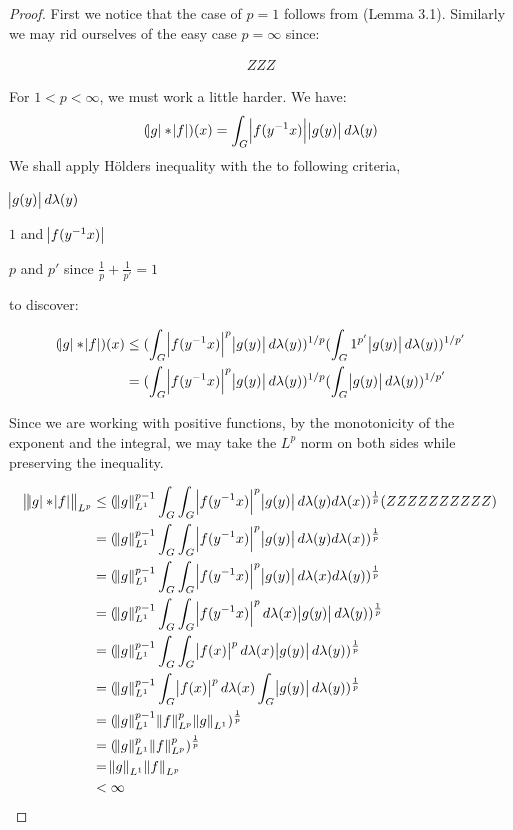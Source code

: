 \begin{proof}
First we notice that the case of $p=1$ follows from (Lemma 3.1). Similarly we may rid ourselves of the easy case $p=\infty$ since:

\begin{align*}
ZZZ
\end{align*}

For $ 1 < p < \infty$, we must work a little harder. We have:
\begin{equation*}
(\abs{g} \ast \abs{f} )(x) = \int_G \abs{f(y^{-1}x)}\abs{g(y)} d\lambda(y)
\end{equation*}
We shall apply H\"olders inequality with the to following criteria,

\begin{description}
[align=right,labelwidth=3cm]
\item [Measure] $\abs{g(y)} d\lambda(y)$
\item [Functions] $1$ and $\abs{f(y^{-1}x)}$
\item [Exponents] $p$ and $p'$ since $\frac{1}{p}+\frac{1}{p'} = 1$
\end{description}

to discover:

\begin{align*}
(\abs{g} \ast \abs{f} )(x) &\leq (\int_G \abs{f(y^{-1}x)}^p \abs{g(y)} d\lambda(y))^{1/p} (\int_G 1^{p'} \abs{g(y)} 
 d\lambda(y))^{1/p'} \\
 &= (\int_G \abs{f(y^{-1}x)}^p \abs{g(y)} d\lambda(y))^{1/p} (\int_G \abs{g(y)} 
 d\lambda(y))^{1/p'}
\end{align*}

Since we are working with positive functions, by the monotonicity of the exponent and the integral, we may take the $L^p$ norm on both sides while preserving the inequality.

\begin{align*}
\norm{\abs{g} \ast \abs{f}}_{L^p} &\leq
(\norm{g}^{p-1}_{L^1} \int_G \int_G \abs{f(y^{-1}x)}^p \abs{g(y)} d\lambda(y)d\lambda(x) )^\frac{1}{p} (ZZZZZZZZZZ) \\
&= (\norm{g}^{p-1}_{L^1} \int_G \int_G \abs{f(y^{-1}x)}^p \abs{g(y)} d\lambda(y)d\lambda(x) )^\frac{1}{p} \\
&= (\norm{g}^{p-1}_{L^1} \int_G \int_G \abs{f(y^{-1}x)}^p \abs{g(y)} d\lambda(x)d\lambda(y) )^\frac{1}{p} \\
&= (\norm{g}^{p-1}_{L^1} \int_G \int_G \abs{f(y^{-1}x)}^p  d\lambda(x) \abs{g(y)} d\lambda(y) )^\frac{1}{p} \\
&= (\norm{g}^{p-1}_{L^1} \int_G \int_G \abs{f(x)}^p  d\lambda(x) \abs{g(y)} d\lambda(y) )^\frac{1}{p} \\
&= (\norm{g}^{p-1}_{L^1} \int_G \abs{f(x)}^p  d\lambda(x) \int_G  \abs{g(y)} d\lambda(y) )^\frac{1}{p} \\
&= (\norm{g}^{p-1}_{L^1} \norm{f}^p_{L^p} \norm{g}_{L^1})^\frac{1}{p} \\
&= (\norm{g}^{p}_{L^1} \norm{f}^p_{L^p})^\frac{1}{p} \\
&= \norm{g}_{L^1} \norm{f}_{L^p}\\
&< \infty
\end{align*}


\end{proof}
